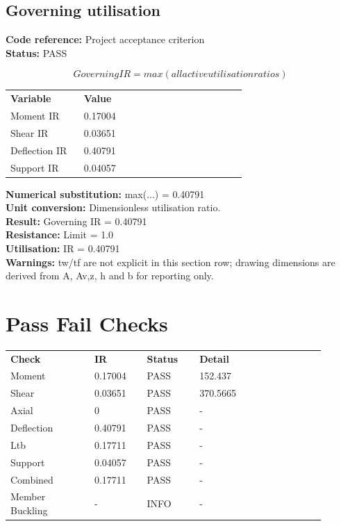 \documentclass[11pt,a4paper]{article}
\begin{document}
\subsection{Governing utilisation}
\textbf{Code reference:} Project acceptance criterion\\
\textbf{Status:} PASS

\[
Governing IR = max(all active utilisation ratios)
\]

\begin{longtable}{p{0.28\linewidth}p{0.62\linewidth}}
\textbf{Variable} & \textbf{Value} \\
Moment IR & 0.17004 \\
Shear IR & 0.03651 \\
Deflection IR & 0.40791 \\
Support IR & 0.04057 \\
\end{longtable}

\textbf{Numerical substitution:} max(...) = 0.40791\\
\textbf{Unit conversion:} Dimensionless utilisation ratio.\\
\textbf{Result:} Governing IR = 0.40791\\
\textbf{Resistance:} Limit = 1.0\\
\textbf{Utilisation:} IR = 0.40791\\
\textbf{Warnings:} tw/tf are not explicit in this section row; drawing dimensions are derived from A, Av,z, h and b for reporting only.



\section{Pass Fail Checks}
\begin{longtable}{p{0.24\linewidth}p{0.15\linewidth}p{0.15\linewidth}p{0.36\linewidth}}
\textbf{Check} & \textbf{IR} & \textbf{Status} & \textbf{Detail} \\
Moment & 0.17004 & PASS & 152.437 \\
Shear & 0.03651 & PASS & 370.5665 \\
Axial & 0 & PASS & - \\
Deflection & 0.40791 & PASS & - \\
Ltb & 0.17711 & PASS & - \\
Support & 0.04057 & PASS & - \\
Combined & 0.17711 & PASS & - \\
Member Buckling & - & INFO & - \\
\end{longtable}
\end{document}

